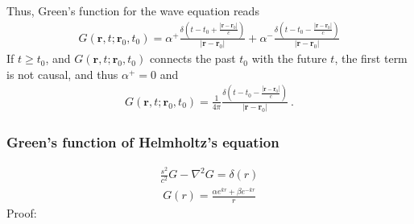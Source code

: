 \documentclass[letterpaper,10pt,italian]{jupyterBook}
\begin{document}
\sphinxAtStartPar
Thus, Green’s function for the wave equation reads
\begin{equation*}
\begin{split}G(\mathbf{r},t; \mathbf{r}_0, t_0) = 
  \alpha^+ \frac{ \delta \left( t - t_0 + \frac{|\mathbf{r}-\mathbf{r}_0|}{c} \right)}{|\mathbf{r} - \mathbf{r}_0|} +
  \alpha^- \frac{ \delta \left( t - t_0 - \frac{|\mathbf{r}-\mathbf{r}_0|}{c} \right)}{|\mathbf{r} - \mathbf{r}_0|}
\end{split}
\end{equation*}
\sphinxAtStartPar
If \(t \ge t_0\), and \(G(\mathbf{r}, t; \mathbf{r}_0, t_0)\) connects the past \(t_0\) with the future \(t\), the first term is not causal, and thus \(\alpha^+ = 0\) and
\begin{equation*}
\begin{split}G(\mathbf{r},t; \mathbf{r}_0, t_0) = \frac{1}{4 \pi} \frac{ \delta \left( t - t_0 - \frac{|\mathbf{r}-\mathbf{r}_0|}{c} \right)}{|\mathbf{r} - \mathbf{r}_0|} \ .\end{split}
\end{equation*}\subsubsection*{Green’s function of Helmholtz’s equation}
\begin{equation*}
\begin{split}\frac{s^2}{c^2} G - \nabla^2 G = \delta(r)\end{split}
\end{equation*}\begin{equation*}
\begin{split}G(r) = \frac{\alpha e^{k r} + \beta e^{-kr}}{r}\end{split}
\end{equation*}
\sphinxAtStartPar
Proof:
\end{document}
